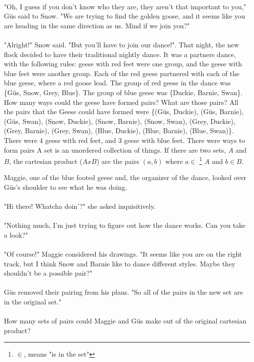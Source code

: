 \paragraph{} "Oh, I guess if you don't know who they are, they aren't that important to you," G{\"u}s said to Snow. "We are trying to find the golden goose, and it seems like you are heading in the same direction as us. Mind if we join you?"
\paragraph{} "Alright!" Snow said. "But you'll have to join our dance!".
\vfill
\pagebreak
{}
{That night, the new flock decided to have their traditional nightly dance. It was a partners dance, with the following rules: geese with red feet were one group, and the geese with blue feet were another group. Each of the red geese partnered with each of the blue geese, where a red goose lead. The group of red geese in the dance was \{G{\"u}s, Snow, Grey, Blue\}. The group of blue geese was \{Duckie, Barnie, Swan\}. How many ways could the geese have formed pairs? What are those pairs?}
{All the pairs that the Geese could have formed were \{(G{\"u}s, Duckie), (G{\"u}s, Barnie), (G{\"u}s, Swan), (Snow, Duckie), (Snow, Barnie), (Snow, Swan), (Grey, Duckie), (Grey, Barnie), (Grey, Swan), (Blue, Duckie), (Blue, Barnie), (Blue, Swan)\}. There were 4 geese with red feet, and 3 geese with blue feet. There were  ways to form pairs}
{A set is an unordered collection of things. If there are two sets, $A$ and $B$, the cartesian product ($AxB$) are the pairs $(a, b)$ where $a\in$ \footnote{$\in$, means "is in the set"} $A$ and $b\in B$.}
{}
{Maggie, one of the blue footed geese and, the organizer of the dance, looked over G{\"u}s's shoulder to see what he was doing. \paragraph{} "Hi there! Whatcha doin'?" she asked inquisitively.
\paragraph{} "Nothing much, I'm just trying to figure out how the dance works. Can you take a look?"
\paragraph{} "Of course!" Maggie considered his drawings. "It seems like you are on the right track, but I think Snow and Barnie like to dance different styles. Maybe they shouldn't be a possible pair?"
\paragraph{} G{\"u}s removed their pairing from his plans. "So all of the pairs in the new set are in the original set."
\paragraph{} How many sets of pairs could Maggie and G{\"u}s make out of the original cartesian product?}
